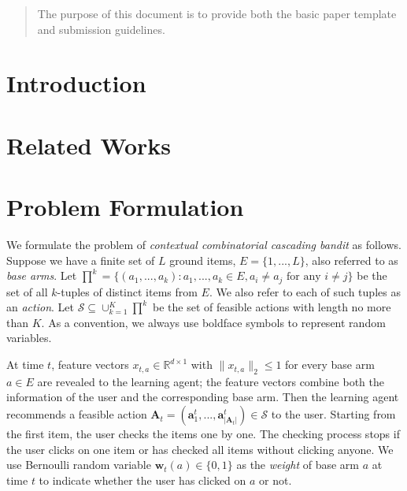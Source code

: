 \documentclass{article}
\newcommand{\RR}{\mathbb{R}}
\newcommand{\bA}{\mathbf{A}}
\newcommand{\ba}{\mathbf{a}}
\newcommand{\bw}{\mathbf{w}}
\newcommand{\cS}{\mathcal{S}}
\newcommand{\abs}[1]{\left| #1 \right|}
\newcommand{\norm}[1]{\| #1 \|}
\begin{document}
 
	
	
\begin{abstract} 
The purpose of this document is to provide both the basic paper template and submission guidelines.
\end{abstract} 
	
\section{Introduction}
	
\section{Related Works}
	
\section{Problem Formulation}

We formulate the problem of {\em contextual combinatorial cascading bandit} as follows. Suppose we have a finite set of $L$ ground items,  $E=\{1,...,L\}$, also referred to as {\em base arms}. 
Let $\prod^k=\{(a_1,...,a_k): a_1,...,a_k \in E, a_i \neq a_j \text{ for any } i \neq j\}$ be the set of all $k$-tuples of distinct items from $E$. We also refer to each of such tuples as an {\em action}.
Let $\cS \subseteq \cup_{k=1}^K \prod^{k}$ be the set of feasible actions with length no more than $K$. 
As a convention, we always use boldface symbols to represent random variables.

At time $t$, feature vectors $x_{t,a} \in \RR^{d \times 1}$ with $\norm{x_{t,a}}_2 \leq 1$ for every base arm $a \in E$ are revealed to the learning agent; the feature vectors combine both the information of the user and the corresponding base arm. Then the learning agent recommends a feasible action $\bA_t=(\ba_{1}^t,...,\ba_{\abs{\bA_t}}^t) \in \cS$ to the user. 
Starting from the first item, the user checks the items one by one. The checking process stops if the user clicks on one item or has checked all items without clicking anyone. We use Bernoulli random variable $\bw_{t}(a) \in \{0,1\}$ as the {\em weight} of base arm $a$ at time $t$ to indicate whether the user has clicked on $a$ or not. 
\end{document}
